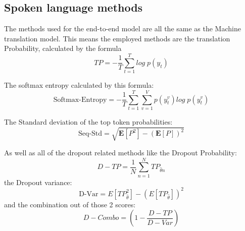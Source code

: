\subsection{Spoken language methods}
The methods used for the end-to-end model are all the same as the Machine translation model.
This means the employed methods are the translation Probability, calculated by the formula $$TP=-\frac{1}{T}\sum_{t=1}^T log\; p(y_t)$$

The softmax entropy calculated by this formula: $$\text{Softmax-Entropy}=-\frac{1}{T}\sum_{t=1}^T\sum_{v=1}^V p(y_t^v)log\; p(y_t^v)$$

The Standard deviation of the top token probabilities: $$\text{Seq-Std}=\sqrt{\mathbf{E}[P^2]-(\mathbf{E}[P])^2}$$

As well as all of the dropout related methods like the Dropout Probability: $$D-TP=\frac{1}{N}\sum_{n=1}^N TP_{\hat\theta n}$$ the Dropout variance: $$\text{D-Var}=E[TP_{\hat\theta}^2]-(E[TP_{\hat\theta}])^2$$ and the combination out of those 2 scores: $$D-Combo=(1-\frac{D-TP}{D-Var})$$
